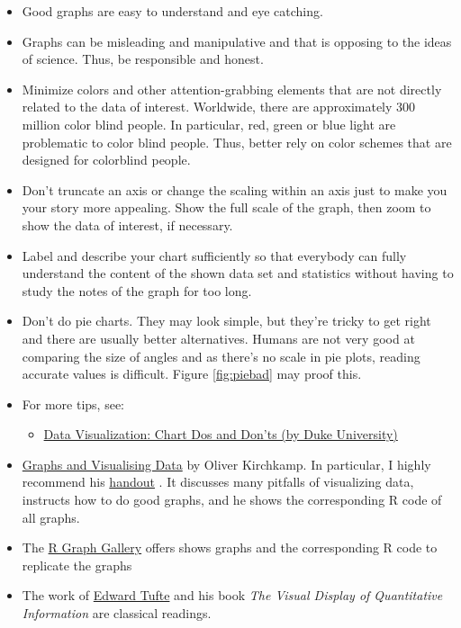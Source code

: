 \documentclass[
  12pt,
  oneside]{book}
\providecommand{\tightlist}{%
  \setlength{\itemsep}{0pt}\setlength{\parskip}{0pt}}
\begin{document}
\begin{itemize}
\tightlist
\item
  Good graphs are easy to understand and eye catching.
\item
  Graphs can be misleading and manipulative and that is opposing to the ideas of science. Thus, be responsible and honest.
\item
  Minimize colors and other attention-grabbing elements that are not directly related to the data of interest. Worldwide, there are approximately 300 million color blind people. In particular, red, green or blue light are problematic to color blind people. Thus, better rely on color schemes that are designed for colorblind people.
\item
  Don't truncate an axis or change the scaling within an axis just to make you your story more appealing. Show the full scale of the graph, then zoom to show the data of interest, if necessary.
\item
  Label and describe your chart sufficiently so that everybody can fully understand the content of the shown data set and statistics without having to study the notes of the graph for too long.
\item
  Don't do pie charts. They may look simple, but they're tricky to get right and there are usually better alternatives. Humans are not very good at comparing the size of angles and as there's no scale in pie plots, reading accurate values is difficult. Figure \ref{fig:piebad} may proof this.
\item
  For more tips, see:

  \begin{itemize}
  \tightlist
  \item
    \href{https://guides.library.duke.edu/datavis/topten}{Data Visualization: Chart Dos and Don'ts (by Duke University)}
  \end{itemize}
\item
  \href{https://www.kirchkamp.de/graph/}{Graphs and Visualising Data} by Oliver Kirchkamp. In particular, I highly recommend his \href{https://www.kirchkamp.de/oekonometrie/pdf/gra-p.pdf}{handout} \citep{Kirchkamp2018Using}. It discusses many pitfalls of visualizing data, instructs how to do good graphs, and he shows the corresponding R code of all graphs.\\
\item
  The \href{https://www.r-graph-gallery.com}{R Graph Gallery} offers shows graphs and the corresponding R code to replicate the graphs
\item
  The work of \href{www.edwardtufte.com}{Edward Tufte} and his book \emph{The Visual Display of Quantitative Information} \citep{Tufte2022Visual} are classical readings.
\end{itemize}
\end{document}
